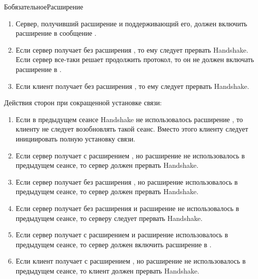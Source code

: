 \begin{appendix}{Б}{обязательное}{Расширение }
\begin{enumerate}
\item
Сервер, получивший расширение  и
поддерживающий его, должен включить расширение в сообщение
.

\item
Если сервер получает  без расширения 
, то ему следует прервать 
Handshake. Если сервер все-таки решает продолжить протокол, 
то он не должен включать расширение в .

\item
Если клиент получает  без расширения 
, то ему следует прервать Handshake.
\end{enumerate}

\label{EMS.AbbrHS}

Действия сторон при сокращенной установке связи:
\begin{enumerate}
\item
Если в предыдущем сеансе Handshake не использовалось расширение
, то клиенту не следует возобновлять такой
сеанс. Вместо этого клиенту следует инициировать полную установку связи.

\item
Если сервер получает  с расширением
, но расширение не использовалось в предыдущем
сеансе, то сервер должен прервать Handshake.

\item
Если сервер получает  без расширения
, но расширение использовалось в предыдущем 
сеансе, то сервер должен прервать Handshake.

\item
Если сервер получает  без расширения
 и расширение не использовалось в предыдущем 
сеансе, то серверу следует прервать Handshake.

\item
Если сервер получает  с расширением
 и расширение использовалось в предыдущем 
сеансе, то сервер должен включить расширение в .

\item
Если клиент получает  с расширением
, но расширение не использовалось в предыдущем 
сеансе, то клиент должен прервать Handshake.


\end{enumerate}
\end{appendix}
